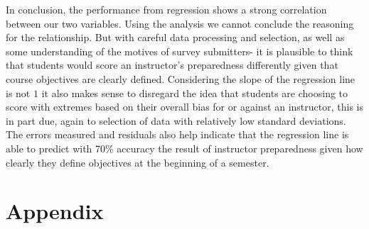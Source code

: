 \documentclass[10pt]{report}
\begin{document}
In conclusion, the performance from regression shows a strong correlation between our two variables. Using the analysis we cannot conclude
the reasoning for the relationship. But with careful data processing and selection, as well as some understanding of the motives of survey 
submitters- it is plausible to think that students would score an instructor's preparedness differently given that course objectives are
clearly defined. Considering the slope of the regression line is not $1$ it also makes sense to disregard the idea that students are choosing
to score with extremes based on their overall bias for or against an instructor, this is in part due, again to selection of data with relatively
low standard deviations. The errors measured and residuals also help indicate that the regression line is able to predict with 70\% accuracy the 
result of instructor preparedness given how clearly they define objectives at the beginning of a semester. \\




\newpage
\section*{Appendix}
\end{document}
